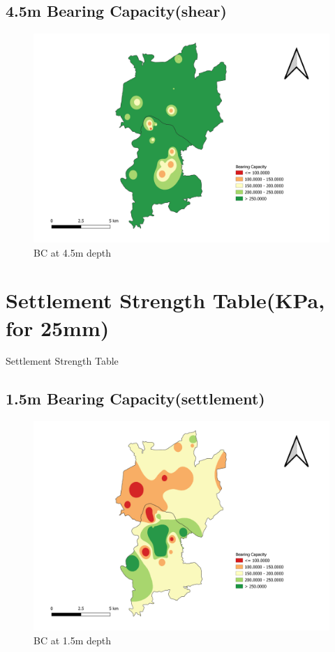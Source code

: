 \begin{landscape}
\section{4.5m Bearing Capacity(shear)}
\begin{figure}[!hbt]
\centering
\includegraphics[width=0.8\linewidth, height=0.8\textheight,keepaspectratio]{in/map/Shear_4_5.png}
\caption{BC at 4.5m depth}
\end{figure}
\pagebreak
\end{landscape}

\section{Settlement Strength Table(KPa, for 25mm)}
\begin{table}[!h]
\caption{Settlement Strength Table}

\end{table}
\pagebreak

\begin{landscape}
\section{1.5m Bearing Capacity(settlement)}
\begin{figure}[!hbt]
\centering
\includegraphics[width=0.8\linewidth, height=0.8\textheight,keepaspectratio]{in/map/Deflection_1_5.png}
\caption{BC at 1.5m depth}
\end{figure}
\pagebreak
\end{landscape}

